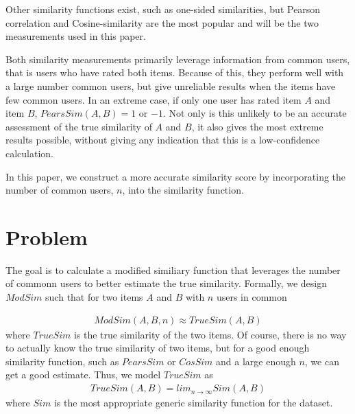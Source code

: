 \documentclass[11pt]{article}
\begin{document}
Other similarity functions exist, such as one-sided similarities, but Pearson
correlation and Cosine-similarity are the most popular and will be the two
measurements used in this paper. \footnotemark


Both similarity measurements primarily leverage information from common users,
that is users who have rated both items. Because of this, they perform well with
a large number common users, but give unreliable results when the items have few
common users. In an extreme case, if only one user has rated item $A$ and item
$B$, $PearsSim(A, B) = 1$ or $-1$. Not only is this unlikely to be an accurate
assessment of the true similarity of $A$ and $B$, it also gives the most extreme
results possible, without giving any indication that this is a low-confidence
calculation.

In this paper, we construct a more accurate similarity score by incorporating
the number of common users, $n$, into the similarity function. 

\section*{Problem}

The goal is to calculate a modified similiary function that leverages the number
of commonn users to better estimate the true similarity. Formally, we design
$ModSim$ such that for two items $A$ and $B$ with $n$ users in common

\begin{align}
ModSim(A, B, n) \approx TrueSim(A, B)
\end{align}
where $TrueSim$ is the true similarity of the two items. Of course, there is no
way to actually know the true similarity of two items, but for a good enough
similarity function, such as $PearsSim$ or $CosSim$ and a large enough $n$, we
can get a good estimate. Thus, we model $TrueSim$ as 
\begin{align}
TrueSim(A, B) = lim_{n\to\infty}Sim(A, B)
\end{align}
where $Sim$ is the most appropriate generic similarity function for the dataset.
\end{document}
